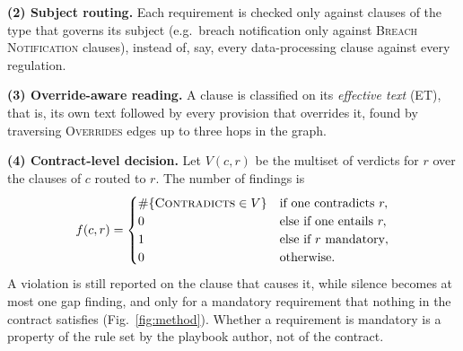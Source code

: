 \documentclass[conference]{IEEEtran}
\begin{document}
\textbf{(2) Subject routing.} Each requirement is checked only against clauses of the type that governs its subject (e.g.\ breach notification only against \textsc{Breach Notification} clauses), instead of, say, every data-processing clause against every regulation.

\textbf{(3) Override-aware reading.} A clause is classified on its \emph{effective text} (ET), that is, its own text followed by every provision that overrides it, found by traversing \textsc{Overrides} edges up to three hops in the graph.

\textbf{(4) Contract-level decision.} Let $V(c,r)$ be the multiset of verdicts for $r$ over the clauses of $c$ routed to $r$. The number of findings is
\begin{equation}
f(c,r)=\begin{cases}
\#\{\textsc{Contradicts}\in V\} & \text{if one contradicts } r,\\
0 & \text{else if one entails } r,\\
1 & \text{else if } r \text{ mandatory},\\
0 & \text{otherwise.}
\end{cases}
\end{equation}
A violation is still reported on the clause that causes it, while silence becomes at most one gap finding, and only for a mandatory requirement that nothing in the contract satisfies (Fig.~\ref{fig:method}). Whether a requirement is mandatory is a property of the rule set by the playbook author, not of the contract.
\end{document}
